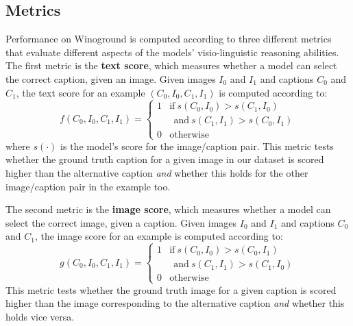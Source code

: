 \documentclass[10pt,twocolumn,letterpaper]{article}
\begin{document}
\subsection{Metrics}\label{sec:metrics}
Performance on Winoground is computed according to three different metrics that evaluate different aspects of the models' visio-linguistic reasoning abilities.
The first metric is the \textbf{text score}, which measures whether a model can select the correct caption, given an image.
Given images $I_0$ and $I_{1}$ and captions $C_{0}$ and $C_{1}$, the text score for an example $(C_{0},I_{0},C_{1},I_{1})$ is computed according to:
\begin{equation}\label{eq:text-score}
        f(C_{0},I_{0},C_{1},I_{1})= 
    \begin{cases}
        1 & \text{if}\  s(C_{0}, I_{0}) > s(C_{1}, I_{0}) \\
        & \ \ \text{and}\ s(C_{1}, I_{1}) > s(C_{0}, I_{1}) \\
        0              & \text{otherwise}
    \end{cases}
\end{equation}
where $s(\cdot)$ is the model's score for the image/caption pair.
This metric tests whether the ground truth caption for a given image in our dataset is scored higher than the alternative caption \textit{and} whether this holds for the other image/caption pair in the example too.



The second metric is the \textbf{image score}, which measures whether a model can select the correct image, given a caption.
Given images $I_0$ and $I_{1}$ and captions $C_{0}$ and $C_{1}$, the image score for an example is computed according to:
\begin{equation}\label{eq:image-score}
        g(C_{0},I_{0},C_{1},I_{1})= 
    \begin{cases}
        1 & \text{if}\  s(C_{0}, I_{0}) > s(C_{0}, I_{1})\\
        & \ \ \text{and}\ s(C_{1}, I_{1}) > s(C_{1}, I_{0}) \\
        0              & \text{otherwise}
    \end{cases}
\end{equation}
This metric tests whether the ground truth image for a given caption is scored higher than the image corresponding to the alternative caption \textit{and} whether this holds vice versa.
\end{document}
